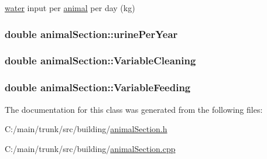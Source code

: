 \hyperlink{classwater}{water} input per \hyperlink{classanimal}{animal} per day (kg) \hypertarget{classanimal_section_ae3f2a70dd57961b9b98842622b6ebcd2}{
\subsubsection[{urinePerYear}]{\setlength{\rightskip}{0pt plus 5cm}double {\bf animalSection::urinePerYear}}}
\label{classanimal_section_ae3f2a70dd57961b9b98842622b6ebcd2}
\hypertarget{classanimal_section_adf379500a581d415c1dfee5d7a9dfdff}{
\subsubsection[{VariableCleaning}]{\setlength{\rightskip}{0pt plus 5cm}double {\bf animalSection::VariableCleaning}}}
\label{classanimal_section_adf379500a581d415c1dfee5d7a9dfdff}
\hypertarget{classanimal_section_a5c7d055ab1ea44cca81097b797c14f52}{
\subsubsection[{VariableFeeding}]{\setlength{\rightskip}{0pt plus 5cm}double {\bf animalSection::VariableFeeding}}}
\label{classanimal_section_a5c7d055ab1ea44cca81097b797c14f52}


The documentation for this class was generated from the following files:\begin{DoxyCompactItemize}
\item 
C:/main/trunk/src/building/\hyperlink{animal_section_8h}{animalSection.h}\item 
C:/main/trunk/src/building/\hyperlink{animal_section_8cpp}{animalSection.cpp}\end{DoxyCompactItemize}
